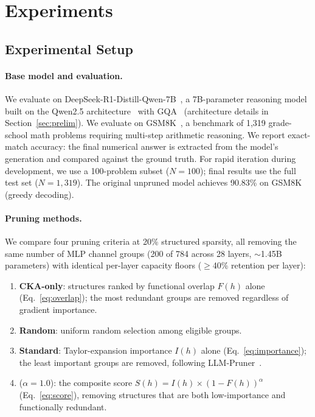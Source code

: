
\section{Experiments}
\label{sec:experiments}

\subsection{Experimental Setup}
\label{sec:exp_setup}

\paragraph{Base model and evaluation.}
We evaluate on DeepSeek-R1-Distill-Qwen-7B~\citep{deepseek2025r1}, a 7B-parameter reasoning model built on the Qwen2.5 architecture~\citep{qwen2.5} with GQA~\citep{ainslie2023gqa} (architecture details in Section~\ref{sec:prelim}).
We evaluate on GSM8K~\citep{cobbe2021gsm8k}, a benchmark of 1{,}319 grade-school math problems requiring multi-step arithmetic reasoning.
We report exact-match accuracy: the final numerical answer is extracted from the model's generation and compared against the ground truth.
For rapid iteration during development, we use a 100-problem subset ($N{=}100$); final results use the full test set ($N{=}1{,}319$).
The original unpruned model achieves 90.83\% on GSM8K (greedy decoding).

\paragraph{Pruning methods.}
We compare four pruning criteria at 20\% structured sparsity, all removing the same number of MLP channel groups (200 of 784 across 28 layers, ${\sim}$1.45B parameters) with identical per-layer capacity floors (${\ge}$40\% retention per layer):
\begin{enumerate}[nosep,leftmargin=*]
    \item \textbf{CKA-only}: structures ranked by functional overlap $F(h)$ alone (Eq.~\ref{eq:overlap}); the most redundant groups are removed regardless of gradient importance.
    \item \textbf{Random}: uniform random selection among eligible groups.
    \item \textbf{Standard}: Taylor-expansion importance $I(h)$ alone (Eq.~\ref{eq:importance}); the least important groups are removed, following LLM-Pruner~\citep{llmpruner2023}.
    \item \textbf{\rasp{}} ($\alpha{=}1.0$): the composite score $S(h) = I(h) \times (1 - F(h))^\alpha$ (Eq.~\ref{eq:score}), removing structures that are both low-importance and functionally redundant.
\end{enumerate}

